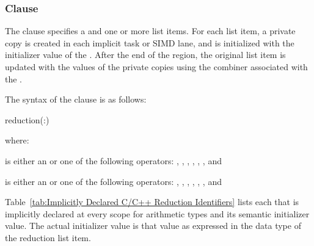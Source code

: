 \subsubsection{ Clause}
\label{subsubsec:reduction clause}
\summary
The  clause specifies a  and one or more list items. For 
each list item, a private copy is created in each implicit task or SIMD lane, and is 
initialized with the initializer value of the . After the end of the 
region, the original list item is updated with the values of the private copies using the 
combiner associated with the .

\syntax
\ccppspecificstart %
The syntax of the  clause is as follows:

\begin{boxedcode}
reduction(:)
\end{boxedcode}

where:

\cspecificstart %
 is either an  or one of the following operators:
\code{+},
\code{-},
\code{*}, 
\code{\&},
\code{|},
\code{\^},
\code{\&\&} and
\code{||} 
\cspecificend %

\cppspecificstart %
 is either an  or one of the following operators:
\code{+},
\code{-},
\code{*}, 
\code{\&},
\code{|},
\code{\^},
\code{\&\&} and
\code{||}
\cppspecificend %

Table~\ref{tab:Implicitly Declared C/C++ Reduction Identifiers} lists each 
 that is implicitly declared at every 
scope for arithmetic types and its semantic initializer value. The actual initializer value 
is that value as expressed in the data type of the reduction list item.


